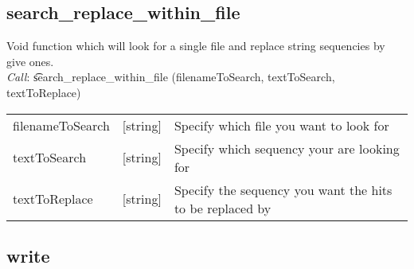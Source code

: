 \subsection{search\_replace\_within\_file}
Void function which will look for a single file and replace string sequencies by give ones.\\
\emph{Call}: \t search\_replace\_within\_file (filenameToSearch, textToSearch, textToReplace)
\begin{table}
  \centering
  \begin{tabular}{p{} p{} p{}}
    filenameToSearch   & [string]  & Specify which file you want to look for\\
    textToSearch     & [string]  & Specify which sequency your are looking for\\
    textToReplace & [string]  & Specify the sequency you want the hits to be replaced by\\
  \end{tabular}
\end{table}
\subsection{write}

